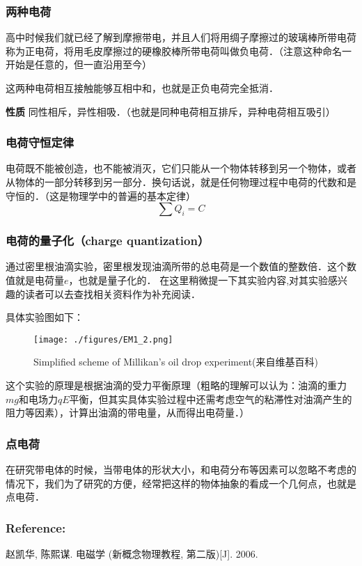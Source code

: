 
\subsubsection{两种电荷}
高中时候我们就已经了解到摩擦带电，并且人们将用绸子摩擦过的玻璃棒所带电荷称为正电荷，将用毛皮摩擦过的硬橡胶棒所带电荷叫做负电荷．（注意这种命名一开始是任意的，但一直沿用至今）

这两种电荷相互接触能够互相中和，也就是正负电荷完全抵消．

\textbf{性质} 同性相斥，异性相吸．（也就是同种电荷相互排斥，异种电荷相互吸引）

\subsubsection{电荷守恒定律}
电荷既不能被创造，也不能被消灭，它们只能从一个物体转移到另一个物体，或者从物体的一部分转移到另一部分．换句话说，就是任何物理过程中电荷的代数和是守恒的．（这是物理学中的普遍的基本定律）
\begin{equation}
\sum Q_i=C
\end{equation}

\subsubsection{电荷的量子化（charge quantization）}
 通过密里根油滴实验，密里根发现油滴所带的总电荷是一个数值的整数倍．这个数值就是电荷量$e$，也就是量子化的．
 在这里稍微提一下其实验内容,对其实验感兴趣的读者可以去查找相关资料作为补充阅读．

具体实验图如下：

\begin{figure}[ht]
\centering
\texttt{[image: ./figures/EM1\_2.png]}
\caption{Simplified scheme of Millikan's oil drop experiment(来自维基百科)} \label{EM1_fig1}
\end{figure}

这个实验的原理是根据油滴的受力平衡原理（粗略的理解可以认为：油滴的重力$mg$和电场力$qE$平衡，但其实具体实验过程中还需考虑空气的粘滞性对油滴产生的阻力等因素），计算出油滴的带电量，从而得出电荷量．）

\subsubsection{点电荷}

在研究带电体的时候，当带电体的形状大小，和电荷分布等因素可以忽略不考虑的情况下，我们为了研究的方便，经常把这样的物体抽象的看成一个几何点，也就是点电荷．


\subsubsection{Reference:} 

赵凯华, 陈熙谋. 电磁学 (新概念物理教程, 第二版)[J]. 2006.


